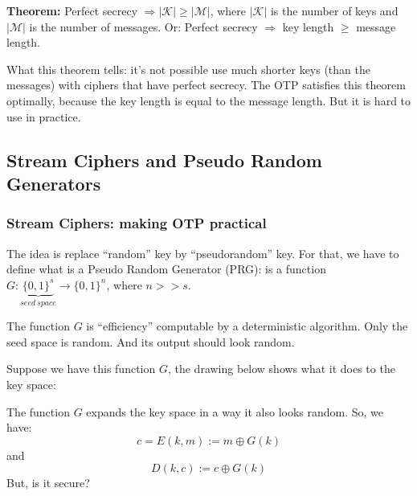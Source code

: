 \documentclass[12pt]{book}
\newcommand{\Thm}{\textbf{Theorem:} }
\begin{document}
\Thm Perfect secrecy $\Rightarrow|\mathcal{K}|\geq|\mathcal{M}|$, where $|\mathcal{K}|$ is the number of keys and $|\mathcal{M}|$ is the number of messages. Or: Perfect secrecy $\Rightarrow$ key length $\geq$ message length.

What this theorem tells: it's not possible use much shorter keys (than the messages) with ciphers that have perfect secrecy. The OTP satisfies this theorem optimally, because the key length is equal to the message length. But it is hard to use in practice.

\subsection{Stream Ciphers and Pseudo Random Generators}
\subsubsection{Stream Ciphers: making OTP practical}
The idea is replace ``random'' key by ``pseudorandom'' key. For that, we have to define what is a Pseudo Random Generator (PRG): is a function $G:\underset{seed\ space}{\underbrace{\{0,1\}^{s}}}\longrightarrow \{0,1\}^{n}$, where $n>>s$.

The function $G$ is ``efficiency'' computable by a deterministic algorithm. Only the seed space is random. And its output should look random.

Suppose we have this function $G$, the drawing below shows what it does to the key space:
\begin{center}
\end{center}
The function $G$ expands the key space in a way it also looks random. So, we have: $$c=E(k,m):=m\oplus G(k)$$ and $$D(k,c):=c\oplus G(k)$$ But, is it secure?
\end{document}
